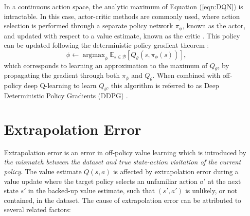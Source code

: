 \documentclass{article}
\newcommand{\ta}{\theta}
\newcommand{\E}{\mathbb{E}}
\newcommand{\lb}{\left [}
\newcommand{\rb}{\right ]}
\newcommand{\B}{\mathcal{B}}
\DeclareMathOperator{\oneargmax}{argmax}
\begin{document}
In a continuous action space, the analytic maximum of Equation (\ref{eqn:DQN}) is intractable. In this case, actor-critic methods are commonly used, where action selection is performed through a separate policy network $\pi_\phi$, known as the actor, and updated with respect to a value estimate, known as the critic \citep{sutton1998reinforcement, konda2003onactor}. This policy can be updated following the deterministic policy gradient theorem \cite{DPG}:
\begin{equation}
\phi \leftarrow \oneargmax_\phi \E_{s \in \B} [Q_\ta (s,\pi_\phi(s))], 
\end{equation}
which corresponds to learning an approximation to the maximum of $Q_\ta$, by propagating the gradient through both $\pi_\phi$ and $Q_\ta$. When combined with off-policy deep Q-learning to learn $Q_\ta$, this algorithm is referred to as Deep Deterministic Policy Gradients (DDPG) \citep{DDPG}.

\vspace{-2mm}
\section{Extrapolation Error}


Extrapolation error is an error in off-policy value learning which is introduced by \textit{the mismatch between the dataset and true state-action visitation of the current policy}. 
The value estimate $Q(s,a)$ is affected by extrapolation error during a value update where the target policy selects an unfamiliar action $a'$ at the next state $s'$ in the backed-up value estimate, such that $(s',a')$ is unlikely, or not contained, in the dataset. 
The cause of extrapolation error can be attributed to several related factors:
\end{document}
